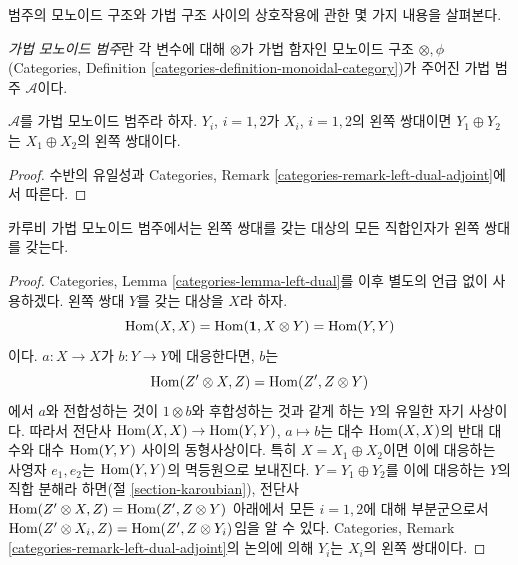 \noindent
범주의 모노이드 구조와 가법 구조 사이의 상호작용에 관한 몇 가지
내용을 살펴본다.

\begin{definition}
\label{definition-additive-monoidal}
{\it 가법 모노이드 범주}란 각 변수에 대해 $\otimes$가 가법 함자인
모노이드 구조 $\otimes, \phi$ (Categories, Definition
\ref{categories-definition-monoidal-category})가 주어진 가법 범주
$\mathcal{A}$이다.
\end{definition}

\begin{lemma}
\label{lemma-additive-dual}
$\mathcal{A}$를 가법 모노이드 범주라 하자.
$Y_i$, $i = 1, 2$가 $X_i$, $i = 1, 2$의 왼쪽 쌍대이면
$Y_1 \oplus Y_2$는 $X_1 \oplus X_2$의 왼쪽 쌍대이다.
\end{lemma}

\begin{proof}
수반의 유일성과 Categories, Remark
\ref{categories-remark-left-dual-adjoint}에서 따른다.
\end{proof}

\begin{lemma}
\label{lemma-Karoubian-dual}
카루비 가법 모노이드 범주에서는 왼쪽 쌍대를 갖는 대상의 모든
직합인자가 왼쪽 쌍대를 갖는다.
\end{lemma}

\begin{proof}
Categories, Lemma \ref{categories-lemma-left-dual}를 이후 별도의 언급
없이 사용하겠다. 왼쪽 쌍대 $Y$를 갖는 대상을 $X$라 하자.
$$
\mathop{\mathrm{Hom}}\nolimits(X, X) = \mathop{\mathrm{Hom}}\nolimits(\mathbf{1}, X \otimes Y) = \mathop{\mathrm{Hom}}\nolimits(Y, Y)
$$
이다. $a : X \to X$가 $b : Y \to Y$에 대응한다면, $b$는
$$
\mathop{\mathrm{Hom}}\nolimits(Z' \otimes X, Z) = \mathop{\mathrm{Hom}}\nolimits(Z', Z \otimes Y)
$$
에서 $a$와 전합성하는 것이 $1 \otimes b$와 후합성하는 것과 같게
하는 $Y$의 유일한 자기 사상이다. 따라서 전단사
$\mathop{\mathrm{Hom}}\nolimits(X, X) \to \mathop{\mathrm{Hom}}\nolimits(Y, Y)$, $a \mapsto b$는 대수
$\mathop{\mathrm{Hom}}\nolimits(X, X)$의 반대 대수와 대수 $\mathop{\mathrm{Hom}}\nolimits(Y, Y)$ 사이의 동형사상이다.
특히 $X = X_1 \oplus X_2$이면 이에 대응하는 사영자 $e_1, e_2$는
$\mathop{\mathrm{Hom}}\nolimits(Y, Y)$의 멱등원으로 보내진다. $Y = Y_1 \oplus Y_2$를 이에
대응하는 $Y$의 직합 분해라 하면(절 \ref{section-karoubian}),
전단사 $\mathop{\mathrm{Hom}}\nolimits(Z' \otimes X, Z) = \mathop{\mathrm{Hom}}\nolimits(Z', Z \otimes Y)$ 아래에서
모든 $i = 1, 2$에 대해 부분군으로서
$\mathop{\mathrm{Hom}}\nolimits(Z' \otimes X_i, Z) = \mathop{\mathrm{Hom}}\nolimits(Z', Z \otimes Y_i)$임을 알 수 있다.
Categories, Remark \ref{categories-remark-left-dual-adjoint}의 논의에
의해 $Y_i$는 $X_i$의 왼쪽 쌍대이다.
\end{proof}


